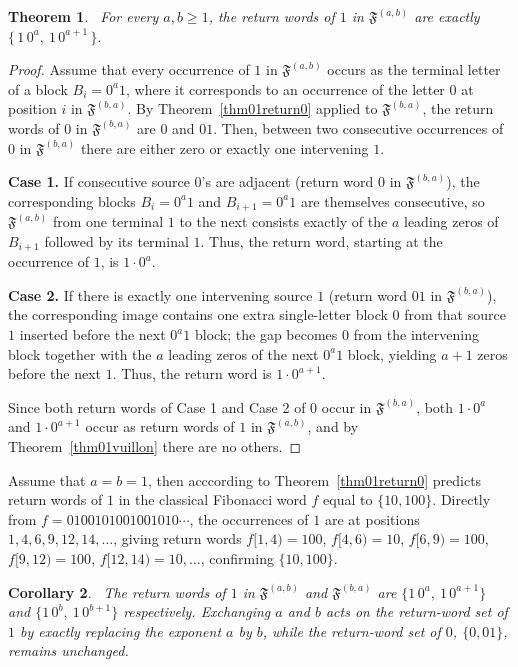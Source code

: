 \documentclass[12pt]{amsart}
\theoremstyle{plain}
\newtheorem{theorem}{Theorem}[section]
\newtheorem{corollary}[theorem]{Corollary}
\theoremstyle{definition}
\theoremstyle{remark}
\newcommand{\FD}{\mathfrak{F}}
\begin{document}
\begin{theorem}~\label{thm02return1}
For every $a,b\geqslant 1$, the return words of $1$ in $\FD^{(a,b)}$ are exactly $\{\,1\,0^a,\ 1\,0^{a+1}\,\}.$
\end{theorem}
\begin{proof}
Assume that every occurrence of $1$ in $\FD^{(a,b)}$ occurs as the terminal letter of
a block $B_i=0^a1$, where it corresponds to an occurrence of the letter
$0$ at position $i$ in $\FD^{(b,a)}$. By Theorem~\ref{thm01return0}
applied to $\FD^{(b,a)}$, the return words of $0$ in $\FD^{(b,a)}$ are $0$
and $01$. Then, between two consecutive occurrences of $0$ in
$\FD^{(b,a)}$ there are either zero or exactly one intervening $1$.

\medskip 


\noindent \textbf{Case 1.} If consecutive source $0$'s are
adjacent (return word $0$ in $\FD^{(b,a)}$), the corresponding blocks
$B_i=0^a1$ and $B_{i+1}=0^a1$ are themselves consecutive, so $\FD^{(a,b)}$ from one terminal $1$ to the next consists exactly of
the $a$ leading zeros of $B_{i+1}$ followed by its terminal $1$. Thus, the
return word, starting at the occurrence of
$1$, is $1\cdot0^a$.

\medskip 


\noindent \textbf{Case 2.} If there is exactly one intervening source $1$ (return word $01$ in $\FD^{(b,a)}$), the corresponding image contains one extra single-letter
block $0$ from that source $1$ inserted before the next $0^a1$ block;
the gap becomes $0$ from the intervening block together with the $a$
leading zeros of the next $0^a1$ block, yielding $a+1$ zeros before the
next $1$. Thus, the return word is $1\cdot0^{a+1}$.

Since both return words of Case 1 and Case 2 of $0$ occur in $\FD^{(b,a)}$, both $1\cdot0^a$ and $1\cdot0^{a+1}$
occur as return words of $1$ in $\FD^{(a,b)}$, and by
Theorem~\ref{thm01vuillon} there are no others.
\end{proof}

Assume that $a=b=1$, then acccording to Theorem~\ref{thm01return0} predicts return words of $1$
in the classical Fibonacci word $f$ equal to $\{10,100\}$. Directly
from $f=0100101001001010\cdots$, the occurrences of $1$ are at
positions $1,4,6,9,12,14,\ldots$, giving return words $f[1,4)=100$,
$f[4,6)=10$, $f[6,9)=100$, $f[9,12)=100$, $f[12,14)=10,\ldots$,
confirming $\{10,100\}$.


\begin{corollary}~\label{cor01returnduality}
The return words of $1$ in $\FD^{(a,b)}$ and $\FD^{(b,a)}$ are $\{1\,0^a,\ 1\,0^{a+1}\}$ and 
$\{1\,0^b,\ 1\,0^{b+1}\}$ respectively. Exchanging $a$ and $b$ acts on the return-word set of $1$ by exactly replacing the exponent $a$ by $b$, while the
return-word set of $0$, $\{0,01\}$, remains unchanged. 
\end{corollary}
\end{document}
